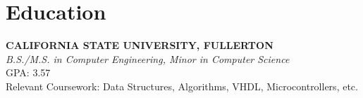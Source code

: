 \section*{Education}
\textbf{CALIFORNIA STATE UNIVERSITY, FULLERTON} \\
\textit{B.S./M.S. in Computer Engineering, Minor in Computer Science} \\
GPA: 3.57 \\
Relevant Coursework: Data Structures, Algorithms, VHDL, Microcontrollers, etc.
